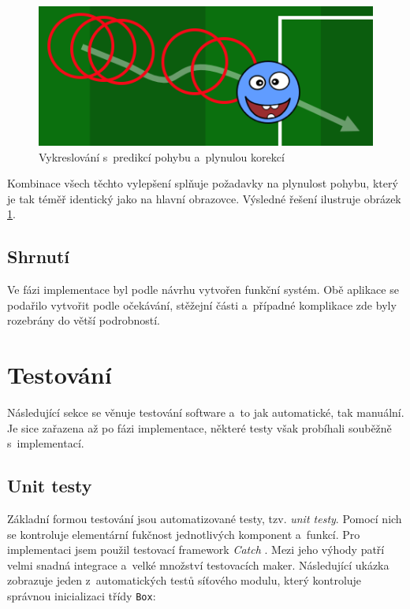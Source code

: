\documentclass[thesis=B,czech,hidelinks]{FITthesis}[2012/06/26] %
\newcommand{\code}[1]{\texttt{#1}}
\begin{document}
\begin{figure}[h]
\center
\includegraphics[width=\textwidth]{player_rendering_3}
\caption{Vykreslování s~predikcí pohybu a~plynulou korekcí}
\label{picture:player_rendering_3}
\end{figure}

Kombinace všech těchto vylepšení splňuje požadavky na plynulost pohybu, který je tak téměř identický jako na hlavní obrazovce. Výsledné řešení ilustruje obrázek \ref{picture:player_rendering_3}.

\subsection{Shrnutí}

Ve fázi implementace byl podle návrhu vytvořen funkční systém. Obě aplikace se podařilo vytvořit podle očekávání, stěžejní části a~případné komplikace zde byly rozebrány do větší podrobností. 

\section{Testování}
\label{section:testing}

Následující sekce se věnuje testování software a~to jak automatické, tak manuální. Je sice zařazena až po fázi implementace, některé testy však probíhali souběžně s~implementací. 

\subsection{Unit testy}

Základní formou testování jsou automatizované testy, tzv. \textit{unit testy}. Pomocí nich se kontroluje elementární fukčnost jednotlivých komponent a~funkcí. Pro implementaci jsem použil testovací framework \textit{Catch} \cite{catch}. Mezi jeho výhody patří velmi snadná integrace a~velké množství testovacích maker. Následující ukázka zobrazuje jeden z~automatických testů síťového modulu, který kontroluje správnou inicializaci třídy \code{Box}:
\end{document}
